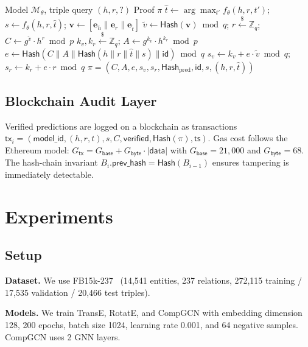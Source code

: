 \documentclass[runningheads]{llncs}
\newcommand{\Z}{\mathbb{Z}}
\newcommand{\Hash}{\mathsf{Hash}}
\newcommand{\embed}{\mathbf{e}}
\newcommand{\vect}[1]{\mathbf{#1}}
\begin{document}
\begin{algorithm}[t]
\caption{ZK-KGVerify Proof Generation}
\label{alg:proof_gen}
\begin{algorithmic}[1]
\REQUIRE Model $\mathcal{M}_\theta$, triple query $(h, r, ?)$
\ENSURE Proof $\pi$
\STATE $\hat{t} \leftarrow \arg\max_{t'} f_\theta(h, r, t')$; \quad $s \leftarrow f_\theta(h, r, \hat{t})$; \quad $\vect{v} \leftarrow [\embed_h \| \embed_r \| \embed_{\hat{t}}]$
\STATE $\tilde{v} \leftarrow \Hash(\vect{v}) \bmod q$; \quad $r \xleftarrow{\$} \Z_q$; \quad $C \leftarrow g^{\tilde{v}} \cdot h^r \bmod p$
\STATE $k_v, k_r \xleftarrow{\$} \Z_q$; \quad $A \leftarrow g^{k_v} \cdot h^{k_r} \bmod p$
\STATE $e \leftarrow \Hash(C \| A \| \Hash(h\|r\|\hat{t}\|s) \| \mathsf{id}) \bmod q$
\STATE $s_v \leftarrow k_v + e \cdot \tilde{v} \bmod q$; \quad $s_r \leftarrow k_r + e \cdot r \bmod q$
\RETURN $\pi = (C, A, e, s_v, s_r, \Hash_{\text{pred}}, \mathsf{id}, s, (h,r,\hat{t}))$
\end{algorithmic}
\end{algorithm}

\subsection{Blockchain Audit Layer}

Verified predictions are logged on a blockchain as transactions $\mathsf{tx}_i = (\mathsf{model\_id}, (h,r,t), s, C, \mathsf{verified}, \Hash(\pi), \mathsf{ts})$. Gas cost follows the Ethereum model: $G_{\mathsf{tx}} = G_{\mathsf{base}} + G_{\mathsf{byte}} \cdot |\mathsf{data}|$ with $G_{\mathsf{base}} = 21{,}000$ and $G_{\mathsf{byte}} = 68$. The hash-chain invariant $B_i.\mathsf{prev\_hash} = \Hash(B_{i-1})$ ensures tampering is immediately detectable.

\section{Experiments}
\label{sec:experiments}

\subsection{Setup}

\textbf{Dataset.} We use FB15k-237~\cite{toutanova2015observed} (14,541 entities, 237 relations, 272,115 training / 17,535 validation / 20,466 test triples).

\textbf{Models.} We train TransE, RotatE, and CompGCN with embedding dimension 128, 200 epochs, batch size 1024, learning rate 0.001, and 64 negative samples. CompGCN uses 2 GNN layers.
\end{document}
